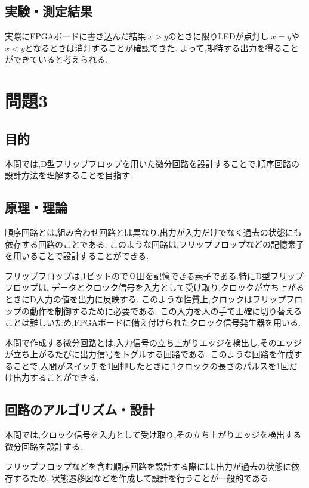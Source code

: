 \documentclass[autodetect-engine, dvi=dvipdfmx, 10pt, a4paper, ja=standard]{bxjsarticle}
\begin{document}
\subsection{実験・測定結果}

実際にFPGAボードに書き込んだ結果,$x > y$のときに限りLEDが点灯し,$x = y$や$x < y$となるときは消灯することが確認できた.
よって,期待する出力を得ることができていると考えられる.

\section{問題3}
\label{sec:ex3}

\subsection{目的}
本問では,D型フリップフロップを用いた微分回路を設計することで,順序回路の設計方法を理解することを目指す.

\subsection{原理・理論}
順序回路とは,組み合わせ回路とは異なり,出力が入力だけでなく過去の状態にも依存する回路のことである.
このような回路は,フリップフロップなどの記憶素子を用いることで設計することができる.

フリップフロップは,1ビットので０田を記憶できる素子である.特にD型フリップフロップは,
データとクロック信号を入力として受け取り,クロックが立ち上がるときにD入力の値を出力に反映する.
このような性質上,クロックはフリップフロップの動作を制御するために必要である.
この入力を人の手で正確に切り替えることは難しいため,FPGAボードに備え付けられたクロック信号発生器を用いる.

本問で作成する微分回路とは,入力信号の立ち上がりエッジを検出し,そのエッジが立ち上がるたびに出力信号をトグルする回路である.
このような回路を作成することで,人間がスイッチを1回押したときに,1クロックの長さのパルスを1回だけ出力することができる.

\subsection{回路のアルゴリズム・設計}

本問では,クロック信号を入力として受け取り,その立ち上がりエッジを検出する微分回路を設計する.

フリップフロップなどを含む順序回路を設計する際には,出力が過去の状態に依存するため,
状態遷移図などを作成して設計を行うことが一般的である.
\end{document}
